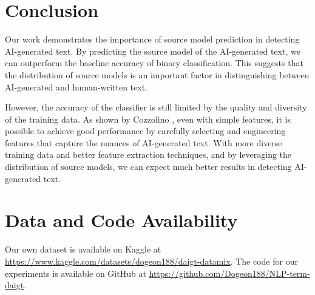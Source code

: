 \documentclass[conference]{IEEEtran}
\begin{document}
\section{Conclusion}

Our work demonstrates the importance of source model prediction in detecting AI-generated text. By predicting the source model of the AI-generated text, we can outperform the baseline accuracy of binary classification. This suggests that the distribution of source models is an important factor in distinguishing between AI-generated and human-written text.

However, the accuracy of the classifier is still limited by the quality and diversity of the training data. As shown by Cozzolino \cite{6thplace}, even with simple features, it is possible to achieve good performance by carefully selecting and engineering features that capture the nuances of AI-generated text. With more diverse training data and better feature extraction techniques, and by leveraging the distribution of source models, we can expect much better results in detecting AI-generated text.

\section{Data and Code Availability}

Our own dataset is available on Kaggle at \url{https://www.kaggle.com/datasets/dogeon188/daigt-datamix}. The code for our experiments is available on GitHub at \url{https://github.com/Dogeon188/NLP-term-daigt}.



\end{document}
